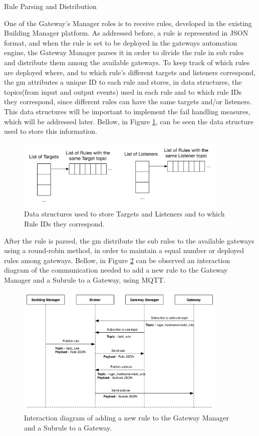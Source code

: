 \begin{Paragraph}{Rule Parsing and Distribution}
	
One of the Gateway's Manager roles is to receive rules, developed in the existing Building Manager platform. As addressed before, a rule is represented in JSON format, and when the rule is set to be deployed in the gateways automation engine, the Gateway Manager parses it in order to divide the rule in sub rules and distribute them among the available gateways. To keep track of which rules are deployed where, and to which rule's different targets and listeners correspond, the \ac{gm} attributes a unique ID to each rule and stores, in data structures, the topics(from input and output events) used in each rule and to which rule IDs they correspond, since different rules can have the same targets and/or listeners. This data structures will be important to implement the fail handling measures, which will be addressed later. Bellow, in Figure \ref{fig:parser_struct}, can be seen the data structure used to store this information.

\begin{figure}[H]
	\centering
	\includegraphics[width=0.9\textwidth]{figures/parser_struct.png}
	\caption{Data structures used to store Targets and Listeners and to which Rule IDs they correspond.}
	\label{fig:parser_struct}
\end{figure}

After the rule is parsed, the \ac{gm} distribute the sub rules to the available gateways using a round-robin method, in order to maintain a equal number or deployed rules among gateways. Bellow, in Figure \ref{fig:addrule} can be observed an interaction diagram of the communication needed to add a new rule to the Gateway Manager and a Subrule to a Gateway, using MQTT.

\begin{figure}[H]
	\centering
	\includegraphics[width=0.9\textwidth]{figures/addrule.png}
	\caption{Interaction diagram of adding a new rule to the Gateway Manager and a Subrule to a Gateway.}
	\label{fig:addrule}
\end{figure}


\end{Paragraph}
